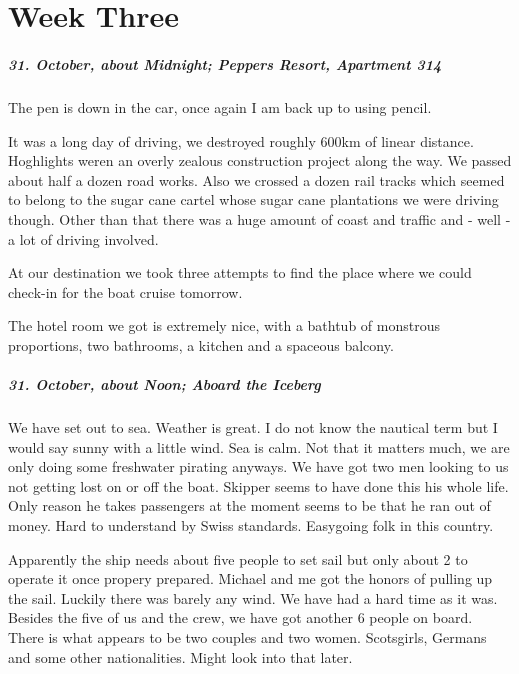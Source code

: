\chapter{Week Three}


\paragraph{31. October, about Midnight; Peppers Resort, Apartment 314}
The pen is down in the car, once again I am back up to using pencil.

It was a long day of driving, we destroyed roughly 600km of linear distance.
Hoghlights weren an overly zealous construction project along the way.
We passed about half a dozen road works.
Also we crossed a dozen rail tracks which seemed to belong to the sugar cane cartel whose sugar cane plantations we were driving though.
Other than that there was a huge amount of coast and traffic and - well - a lot of driving involved.

At our destination we took three attempts to find the place where we could check-in for the boat cruise tomorrow.

The hotel room we got is extremely nice, with a bathtub of monstrous proportions, two bathrooms, a kitchen and a spaceous balcony.

\paragraph{31. October, about Noon; Aboard the Iceberg}
We have set out to sea.
Weather is great.
I do not know the nautical term but I would say sunny with a little wind.
Sea is calm.
Not that it matters much, we are only doing some freshwater pirating anyways.
We have got two men looking to us not getting lost on or off the boat.
Skipper seems to have done this his whole life.
Only reason he takes passengers at the moment seems to be that he ran out of money.
Hard to understand by Swiss standards.
Easygoing folk in this country.

Apparently the ship needs about five people to set sail but only about 2 to operate it once propery prepared.
Michael and me got the honors of pulling up the sail.
Luckily there was barely any wind.
We have had a hard time as it was.
Besides the five of us and the crew, we have got another 6 people on board.
There is what appears to be two couples and two women. Scotsgirls, Germans and some other nationalities.
Might look into that later.

